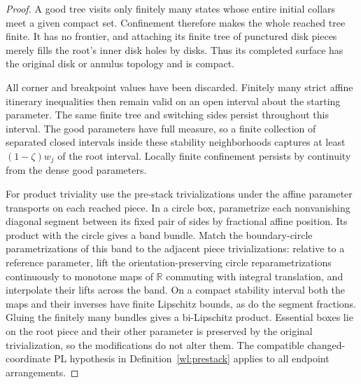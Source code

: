 \documentclass[11pt]{article}
\numberwithin{equation}{section}
\theoremstyle{definition}
\theoremstyle{remark}
\newcommand{\R}{\mathbb R}
\begin{document}
\begin{proof}
A good tree visits only finitely many states whose entire initial
collars meet a given compact set.  Confinement therefore makes the
whole reached tree finite.  It has no frontier, and attaching its
finite tree of punctured disk pieces merely fills the root's inner
disk holes by disks.  Thus its completed surface has the original
disk or annulus topology and is compact.

All corner and breakpoint values have been discarded.  Finitely
many strict affine itinerary inequalities then remain valid on an
open interval about the starting parameter.  The same finite tree
and switching sides persist throughout this interval.  The good
parameters have full measure, so a finite collection of separated
closed intervals inside these stability neighborhoods captures at
least $(1-\zeta)w_j$ of the root interval.  Locally finite confinement
persists by continuity from the dense good parameters.

For product triviality use the pre-stack trivializations under the
affine parameter transports on each reached piece.  In a circle
box, parametrize each nonvanishing diagonal segment between its
fixed pair of sides by fractional affine position.  Its product
with the circle gives a band bundle.  Match the boundary-circle
parametrizations of this band to the adjacent piece
trivializations: relative to a reference parameter, lift the
orientation-preserving circle reparametrizations continuously to
monotone maps of $\R$ commuting with integral translation, and
interpolate their lifts across the band.  On a compact stability
interval both the maps and their inverses have finite Lipschitz
bounds, as do the segment fractions.  Gluing the finitely many
bundles gives a bi-Lipschitz product.  Essential boxes lie on the
root piece and their other parameter is preserved by the original
trivialization, so the modifications do not alter them.  The
compatible changed-coordinate PL hypothesis in
Definition~\ref{wl:prestack} applies to all endpoint arrangements.
\end{proof}
\end{document}
